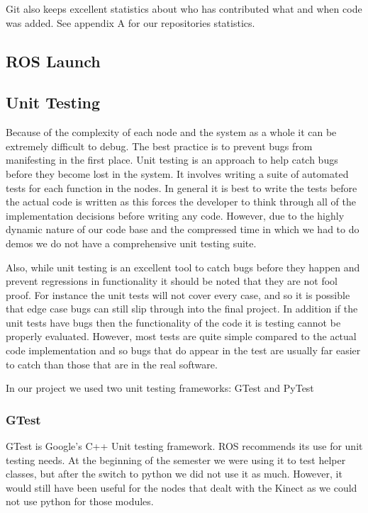 Git also keeps excellent statistics about who has contributed what and when code was added. See appendix A for our repositories statistics.

\subsection{ROS Launch}



\subsection{Unit Testing}

Because of the complexity of each node and the system as a whole it can be extremely difficult to debug. The best practice is to prevent bugs from manifesting in the first place. Unit testing is an approach to help catch bugs before they become lost in the system. It involves writing a suite of automated tests for each function in the nodes. In general it is best to write the tests before the actual code is written as this forces the developer to think through all of the implementation decisions before writing any code. However, due to the highly dynamic nature of our code base and the compressed time in which we had to do demos we do not have a comprehensive unit testing suite.

Also, while unit testing is an excellent tool to catch bugs before they happen and prevent regressions in functionality it should be noted that they are not fool proof.  For instance the unit tests will not cover every case, and so it is possible that edge case bugs can still slip through into the final project. In addition if the unit tests have bugs then the functionality of the code it is testing cannot be properly evaluated. However, most tests are quite simple compared to the actual code implementation and so bugs that do appear in the test are usually far easier to catch than those that are in the real software.

In our project we used two unit testing frameworks: GTest and PyTest

\subsubsection{GTest}

GTest is Google's C++ Unit testing
framework.\cite{google_googletest} ROS recommends
its use for unit testing needs. At the beginning of the semester we were using it to test 
helper classes, but after the switch to python we did not use it as much. However, it would still have been useful for the nodes that dealt with the Kinect as we could not use python for those modules.

